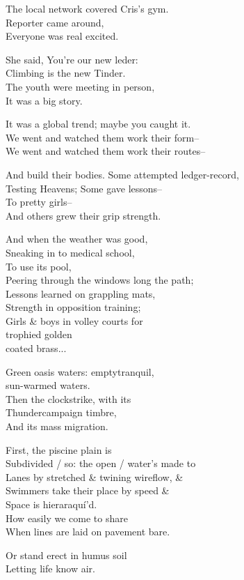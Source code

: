 
The local network covered Cris's gym. \\
Reporter came around,  \\
Everyone was real excited. 

She said, You're our new leder:  \\
Climbing is the new Tinder. \\
The youth were meeting in person, \\
It was a big story. 

It was a global trend; maybe you caught it. \\
We went and watched them work their form-- \\
We went and watched them work their routes--

And build their bodies. Some attempted ledger-record, \\
Testing Heavens; Some gave lessons-- \\
To pretty girls-- \\
And others grew their grip strength. 

And when the weather was good, \\
Sneaking in to medical school, \\
To use its pool, \\
Peering through the windows long the path; \\
Lessons learned on grappling mats, \\
Strength in opposition training; \\
Girls \& boys in volley courts for \\
\quad trophied golden \\
\qquad coated brass...

Green oasis waters: emptytranquil, \\
\quad sun-warmed waters. \\
Then the clockstrike, with its \\ 
Thundercampaign timbre, \\
And its mass migration.

First, the piscine plain is \\
Subdivided / so: the open / water's made to \\
Lanes by stretched \& twining wireflow, \& \\
Swimmers take their place by speed \& \\
Space is hieraraquí'd. \\
How easily we come to share \\
When lines are laid on pavement bare.

Or stand erect in humus soil \\
Letting life know air.
